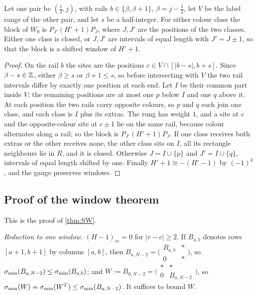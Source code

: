 \begin{lemma}\label{lem:window}
Let one pair be $(\frac12,j)$, with rails $b\in\{\beta,\beta+1\}$, $\beta=j-\frac12$, let $V$
be the label range of the other pair, and let $s$ be a half-integer. For either colour class
the block of $W_0$ is $P_{J'}(H'+1)P_J$, where $J,J'$ are the positions of the two classes.
Either one class is closed, or $J,J'$ are intervals of equal length with $J'=J\pm1$, so
that the block is a shifted window of $H'+1$.
\end{lemma}

\begin{proof}
On the rail $b$ the sites are the positions $c\in V\cap[|b-s|,b+s]$. Since $\beta-s\in\mathbb{Z}$,
either $\beta\ge s$ or $\beta+1\le s$, so before intersecting with $V$ the two rail intervals
differ by exactly one position at each end. Let $I$ be their common part inside $V$; the
remaining positions are at most one $p$ below $I$ and one $q$ above it. At each position the
two rails carry opposite colours, so $p$ and $q$ each join one class, and each class is $I$
plus its extras. The rung has weight $1$, and a site at $c$ and the opposite-colour site at
$c\pm1$ lie on the same rail, because colour alternates along a rail; so the block is
$P_{J'}(H'+1)P_J$. If one class receives both extras or the other receives none, the other
class sits on $I$, all its rectangle neighbours lie in $R$, and it is closed. Otherwise
$J=I\cup\{p\}$ and $J'=I\cup\{q\}$, intervals of equal length shifted by one. Finally
$H'+1\cong-(H'-1)$ by $(-1)^k$, and the gauge preserves windows.
\end{proof}

\subsection*{Proof of the window theorem}

This is the proof of \cref{thm:SW}.

\emph{Reduction to one window.} $(H-1)_{rc}=0$ for $|r-c|\ge2$. If $B_{a,b}$ denotes rows
$[a+1,b+1]$ by columns $[a,b]$, then $B_{a,N-2}=\bigl(\begin{smallmatrix}B_{a,b}&*\\0&*\end{smallmatrix}\bigr)$,
so $\sigma_{\min}(B_{a,N-2})\le\sigma_{\min}(B_{a,b})$; and $W:=B_{0,N-2}=\bigl(\begin{smallmatrix}*&*\\0&B_{a,N-2}\end{smallmatrix}\bigr)$,
so $\sigma_{\min}(W)=\sigma_{\min}(W^T)\le\sigma_{\min}(B_{a,N-2})$. It suffices to bound $W$.

